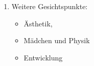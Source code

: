 \begin{enumerate}
\begin{itemize}
	\end{itemize}

	\item Weitere Gesichtspunkte:
	\begin{itemize}
		\item \"{A}sthetik,
		\item M\"{a}dchen und Physik
		\item Entwicklung
	\end{itemize}

\end{enumerate}